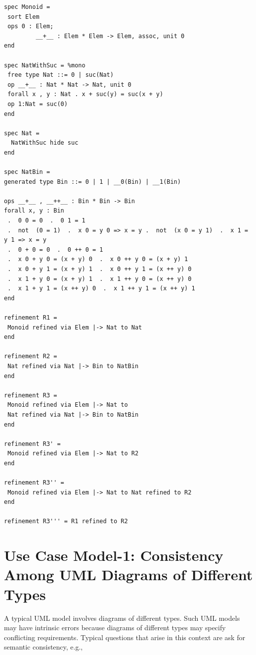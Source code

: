 \documentclass[10pt,fleqn,final]{scrreprt}
\newenvironment{definitions}[0]{\medskip }{}
\begin{document}
\begin{definitions}
\begin{lstlisting}[basicstyle=\ttfamily\footnotesize,language=dolText,alsolanguage=CASL,escapechar=@,mathescape]	
spec Monoid =
 sort Elem
 ops 0 : Elem;
         __+__ : Elem * Elem -> Elem, assoc, unit 0
end

spec NatWithSuc = %mono
 free type Nat ::= 0 | suc(Nat)
 op __+__ : Nat * Nat -> Nat, unit 0 
 forall x , y : Nat . x + suc(y) = suc(x + y)
 op 1:Nat = suc(0)
end

spec Nat =
  NatWithSuc hide suc
end

spec NatBin =
generated type Bin ::= 0 | 1 | __0(Bin) | __1(Bin)

ops __+__ , __++__ : Bin * Bin -> Bin 
forall x, y : Bin 
 .  0 0 = 0  .  0 1 = 1
 .  not  (0 = 1)  .  x 0 = y 0 => x = y .  not  (x 0 = y 1)  .  x 1 = y 1 => x = y
 .  0 + 0 = 0  .  0 ++ 0 = 1 
 .  x 0 + y 0 = (x + y) 0  .  x 0 ++ y 0 = (x + y) 1
 .  x 0 + y 1 = (x + y) 1  .  x 0 ++ y 1 = (x ++ y) 0 
 .  x 1 + y 0 = (x + y) 1  .  x 1 ++ y 0 = (x ++ y) 0
 .  x 1 + y 1 = (x ++ y) 0  .  x 1 ++ y 1 = (x ++ y) 1 
end

refinement R1 =
 Monoid refined via Elem |-> Nat to Nat
end

refinement R2 =
 Nat refined via Nat |-> Bin to NatBin
end

refinement R3 =
 Monoid refined via Elem |-> Nat to
 Nat refined via Nat |-> Bin to NatBin
end

refinement R3' =
 Monoid refined via Elem |-> Nat to R2
end

refinement R3'' = 
 Monoid refined via Elem |-> Nat to Nat refined to R2
end

refinement R3''' = R1 refined to R2

\end{lstlisting}



\section{Use Case Model-1: Consistency Among UML Diagrams of Different Types}
\label{model-1}

A typical UML model involves diagrams of different types. Such UML models may have intrinsic errors because diagrams of different types may specify conflicting 
requirements. Typical questions that arise in this context are ask for
semantic consistency, e.g.,


\end{definitions}
\end{document}
